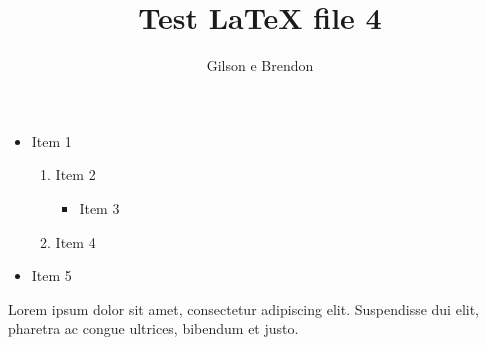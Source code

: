 \documentclass[12pt]{article}
\title{Test LaTeX file 4}
\author{Gilson e Brendon}
\begin{document}
\maketitle

\begin{itemize}
\item Item 1
\begin{enumerate}
\item Item 2
\begin{itemize}
\item Item 3
\end{itemize}
\item Item 4
\end{enumerate}
\item Item 5
\end{itemize}

Lorem ipsum dolor sit amet, consectetur adipiscing elit. Suspendisse dui elit, pharetra ac congue ultrices, bibendum et justo. 
\end{document}
